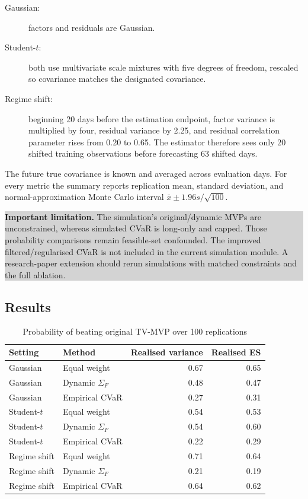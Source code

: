 \documentclass[11pt,a4paper]{article}
\newcommand{\warningBox}[1]{%
  \begin{center}\colorbox{lightgray}{\parbox{0.93\linewidth}{\textbf{Important limitation.} #1}}\end{center}}
\begin{document}
\begin{description}
  \item[Gaussian:] factors and residuals are Gaussian.
  \item[Student-$t$:] both use multivariate scale mixtures with five degrees of freedom, rescaled so covariance matches the designated covariance.
  \item[Regime shift:] beginning 20 days before the estimation endpoint, factor variance is multiplied by four, residual variance by 2.25, and residual correlation parameter rises from 0.20 to 0.65. The estimator therefore sees only 20 shifted training observations before forecasting 63 shifted days.
\end{description}

The future true covariance is known and averaged across evaluation days. For every metric the summary reports replication mean, standard deviation, and normal-approximation Monte Carlo interval $\bar x\pm1.96s/\sqrt{100}$.

\warningBox{The simulation's original/dynamic MVPs are unconstrained, whereas simulated CVaR is long-only and capped. Those probability comparisons remain feasible-set confounded. The improved filtered/regularised CVaR is not included in the current simulation module. A research-paper extension should rerun simulations with matched constraints and the full ablation.}

\subsection{Results}

\begin{table}[H]
\centering
\caption{Probability of beating original TV-MVP over 100 replications}
\label{tab:sim-prob}
\begin{tabular}{@{}llrr@{}}
\toprule
Setting & Method & Realised variance & Realised ES \\
\midrule
Gaussian & Equal weight & 0.67 & 0.65 \\
Gaussian & Dynamic $\Sigma_F$ & 0.48 & 0.47 \\
Gaussian & Empirical CVaR & 0.27 & 0.31 \\
Student-$t$ & Equal weight & 0.54 & 0.53 \\
Student-$t$ & Dynamic $\Sigma_F$ & 0.54 & 0.60 \\
Student-$t$ & Empirical CVaR & 0.22 & 0.29 \\
Regime shift & Equal weight & 0.71 & 0.64 \\
Regime shift & Dynamic $\Sigma_F$ & 0.21 & 0.19 \\
Regime shift & Empirical CVaR & 0.64 & 0.62 \\
\bottomrule
\end{tabular}
\end{table}
\end{document}
